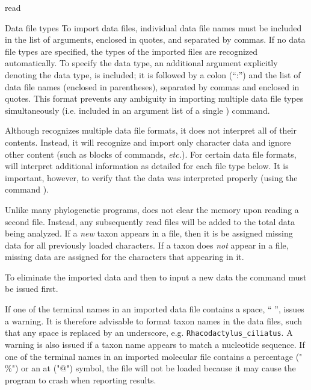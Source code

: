 \begin{command}{read}{}
\begin{poydescription}
\end{poydescription}

\begin{arguments}

\begin{argumentgroup}{Data file types}
To import data files, individual data file names must be included in
the list of  arguments, enclosed in quotes, and
separated by commas. If no data file types are specified, the types
of the imported files are recognized automatically. To specify the
data type, an additional argument explicitly denoting the data type,
is included; it is followed by a colon (``:'') and the list of data
file names (enclosed in parentheses), separated by commas and
enclosed in quotes. This format prevents any ambiguity in importing
multiple data file types simultaneously (i.e. included in an
argument list of a single ) command.

\end{argumentgroup}

\begin{statement}
Although \poy recognizes multiple data file formats, it does not
interpret all of their contents. Instead, it will recognize and import
only character data and ignore other content (such as blocks of
commands, \emph{etc.}). For certain data file formats, \poy will interpret
additional information as detailed for each file type below.
It is important, however, to verify that the data was interpreted properly (using
the command ).
\end{statement}

\begin{statement}
Unlike many phylogenetic programs, \poy does not clear the memory
upon reading a second file. Instead, any subsequently read files
will be added to the total data being analyzed. If a \emph{new} taxon
appears in a file, then it is be assigned missing data for all
previously loaded characters. If a taxon does \emph{not} appear in a
file, missing data are assigned for the characters that appearing in it. 

\setlength{\parindent}{0.5cm}                
\indent To eliminate the imported data and then to input a new data
the  command must be issued first. 
\end{statement}

\begin{statement}
If one of the terminal names in an imported data file contains
a space, `` '', \poy issues a warning. It is therefore advisable to format taxon 
names in the data files, such that any space is replaced by an underscore, e.g. 
\texttt{Rhacodactylus\_ciliatus}. A warning is also issued if a taxon name appears to match a 
nucleotide sequence. If one of the terminal names in an imported molecular 
file contains a percentage ("$\%$") or an at ("$@$") symbol, the file will not be loaded 
because it may cause the program to crash when reporting results.


\end{statement}
\end{arguments}
\end{command}
